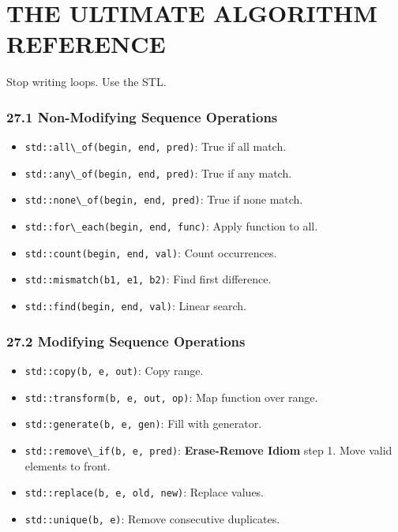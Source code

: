 \hypertarget{the-ultimate-algorithm-reference}{%
\chapter{THE ULTIMATE ALGORITHM
REFERENCE}\label{the-ultimate-algorithm-reference}}

Stop writing loops. Use the STL.

\hypertarget{non-modifying-sequence-operations}{%
\subsection{27.1 Non-Modifying Sequence
Operations}\label{non-modifying-sequence-operations}}

\begin{itemize}
\tightlist
\item
  \passthrough{\lstinline!std::all\_of(begin, end, pred)!}: True if all
  match.
\item
  \passthrough{\lstinline!std::any\_of(begin, end, pred)!}: True if any
  match.
\item
  \passthrough{\lstinline!std::none\_of(begin, end, pred)!}: True if
  none match.
\item
  \passthrough{\lstinline!std::for\_each(begin, end, func)!}: Apply
  function to all.
\item
  \passthrough{\lstinline!std::count(begin, end, val)!}: Count
  occurrences.
\item
  \passthrough{\lstinline!std::mismatch(b1, e1, b2)!}: Find first
  difference.
\item
  \passthrough{\lstinline!std::find(begin, end, val)!}: Linear search.
\end{itemize}

\hypertarget{modifying-sequence-operations}{%
\subsection{27.2 Modifying Sequence
Operations}\label{modifying-sequence-operations}}

\begin{itemize}
\tightlist
\item
  \passthrough{\lstinline!std::copy(b, e, out)!}: Copy range.
\item
  \passthrough{\lstinline!std::transform(b, e, out, op)!}: Map function
  over range.
\item
  \passthrough{\lstinline!std::generate(b, e, gen)!}: Fill with
  generator.
\item
  \passthrough{\lstinline!std::remove\_if(b, e, pred)!}:
  \textbf{Erase-Remove Idiom} step 1. Move valid elements to front.
\item
  \passthrough{\lstinline!std::replace(b, e, old, new)!}: Replace
  values.
\item
  \passthrough{\lstinline!std::unique(b, e)!}: Remove consecutive
  duplicates.
\end{itemize}

